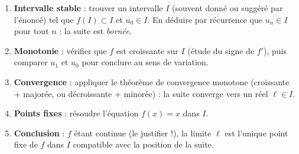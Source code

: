 \documentclass[11pt]{article}
\begin{document}
\begin{methode}[Étude complète d'une suite $u_{n+1} = f(u_n)$]
\begin{enumerate}
\item \textbf{Intervalle stable} : trouver un intervalle $I$ (souvent donné ou suggéré par l'énoncé) tel que $f(I) \subset I$ et $u_0 \in I$. En déduire par récurrence que $u_n \in I$ pour tout $n$ : la suite est \emph{bornée}.
\item \textbf{Monotonie} : vérifier que $f$ est croissante sur $I$ (étude du signe de $f'$), puis comparer $u_1$ et $u_0$ pour conclure au sens de variation.
\item \textbf{Convergence} : appliquer le théorème de convergence monotone (croissante + majorée, ou décroissante + minorée) : la suite converge vers un réel $\ell \in I$.
\item \textbf{Points fixes} : résoudre l'équation $f(x) = x$ dans $I$.
\item \textbf{Conclusion} : $f$ étant continue (le justifier !), la limite $\ell$ est l'unique point fixe de $f$ dans $I$ compatible avec la position de la suite.
\end{enumerate}
\end{methode}
\end{document}
